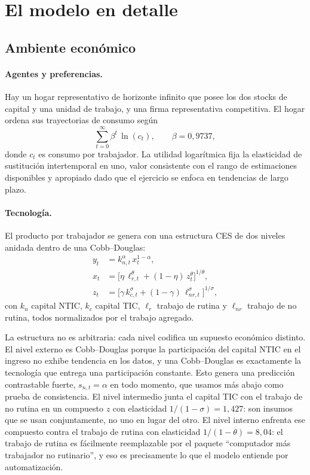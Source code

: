 \documentclass[12pt,letterpaper]{article}
\newcommand{\lr}{\ell_{r}}
\newcommand{\lnr}{\ell_{nr}}
\newcommand{\lrt}{\ell_{r,t}}
\newcommand{\lnrt}{\ell_{nr,t}}
\begin{document}
\section{El modelo en detalle}

\subsection{Ambiente económico}

\paragraph{Agentes y preferencias.}
Hay un hogar representativo de horizonte infinito que posee los dos stocks de capital
y una unidad de trabajo, y una firma representativa competitiva. El hogar ordena
sus trayectorias de consumo según
\begin{equation}
\sum_{t=0}^{\infty}\beta^{t}\,\ln(c_{t}), \qquad \beta = 0{,}9737,
\end{equation}
donde $c_t$ es consumo por trabajador. La utilidad logarítmica fija la elasticidad de
sustitución intertemporal en uno, valor consistente con el rango de estimaciones
disponibles y apropiado dado que el ejercicio se enfoca en tendencias de largo plazo.

\paragraph{Tecnología.}
El producto por trabajador se genera con una estructura CES de dos niveles anidada
dentro de una Cobb--Douglas:
\begin{align}
y_{t} &= k_{n,t}^{\alpha}\, x_{t}^{1-\alpha}, \label{eq:y}\\
x_{t} &= \Big[\eta\, \lrt^{\theta} + (1-\eta)\, z_{t}^{\theta}\Big]^{1/\theta}, \label{eq:x}\\
z_{t} &= \Big[\gamma\, k_{c,t}^{\sigma} + (1-\gamma)\, \lnrt^{\sigma}\Big]^{1/\sigma}, \label{eq:z}
\end{align}
con $k_{n}$ capital NTIC, $k_{c}$ capital TIC, $\lr$ trabajo de rutina y $\lnr$ trabajo
de no rutina, todos normalizados por el trabajo agregado.

La estructura no es arbitraria: cada nivel codifica un supuesto económico distinto.
El nivel externo es Cobb--Douglas porque la participación del capital NTIC en el
ingreso no exhibe tendencia en los datos, y una Cobb--Douglas es exactamente la
tecnología que entrega una participación constante. Esto genera una predicción
contrastable fuerte, $s_{n,t}=\alpha$ en todo momento, que usamos más abajo como
prueba de consistencia. El nivel intermedio junta el capital TIC con el trabajo de no
rutina en un compuesto $z$ con elasticidad $1/(1-\sigma)=1{,}427$: son insumos que se
usan conjuntamente, no uno en lugar del otro. El nivel interno enfrenta ese compuesto
contra el trabajo de rutina con elasticidad $1/(1-\theta)=8{,}04$: el trabajo de rutina
es fácilmente reemplazable por el paquete ``computador más trabajador no rutinario'',
y eso es precisamente lo que el modelo entiende por automatización.
\end{document}
